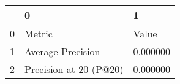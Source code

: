 \begin{tabular}{lll}
\toprule
 & 0 & 1 \\
\midrule
0 & Metric & Value \\
1 & Average Precision & 0.000000 \\
2 & Precision at 20 (P@20) & 0.000000 \\
\bottomrule
\end{tabular}
